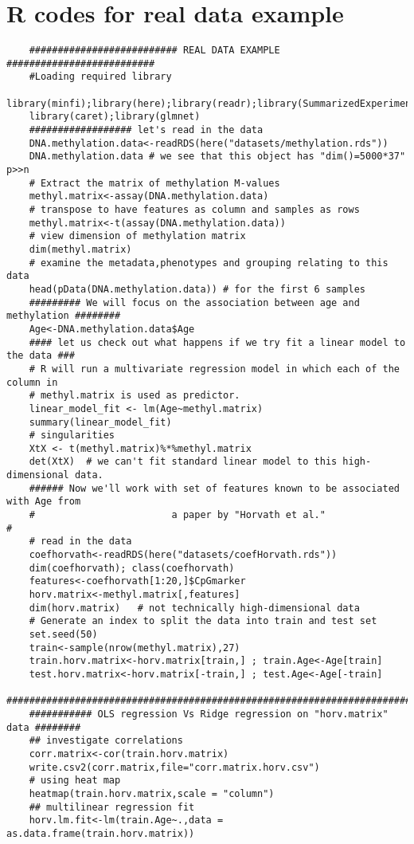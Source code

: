 \documentclass[12pt]{report}
\begin{document}
\section{R codes for real data example}
\label{a2}
\begin{lstlisting}
	########################## REAL DATA EXAMPLE ##########################
	#Loading required library
	library(minfi);library(here);library(readr);library(SummarizedExperiment)
	library(caret);library(glmnet)
	################## let's read in the data
	DNA.methylation.data<-readRDS(here("datasets/methylation.rds"))
	DNA.methylation.data # we see that this object has "dim()=5000*37" p>>n
	# Extract the matrix of methylation M-values
	methyl.matrix<-assay(DNA.methylation.data)
	# transpose to have features as column and samples as rows
	methyl.matrix<-t(assay(DNA.methylation.data))
	# view dimension of methylation matrix
	dim(methyl.matrix)
	# examine the metadata,phenotypes and grouping relating to this data
	head(pData(DNA.methylation.data)) # for the first 6 samples
	######### We will focus on the association between age and methylation ########
	Age<-DNA.methylation.data$Age
	#### let us check out what happens if we try fit a linear model to the data ###
	# R will run a multivariate regression model in which each of the column in 
	# methyl.matrix is used as predictor.
	linear_model_fit <- lm(Age~methyl.matrix)
	summary(linear_model_fit)
	# singularities
	XtX <- t(methyl.matrix)%*%methyl.matrix
	det(XtX)  # we can't fit standard linear model to this high-dimensional data.
	###### Now we'll work with set of features known to be associated with Age from
	#                        a paper by "Horvath et al."                         #
	# read in the data
	coefhorvath<-readRDS(here("datasets/coefHorvath.rds"))
	dim(coefhorvath); class(coefhorvath)
	features<-coefhorvath[1:20,]$CpGmarker
	horv.matrix<-methyl.matrix[,features]
	dim(horv.matrix)   # not technically high-dimensional data 
	# Generate an index to split the data into train and test set
	set.seed(50)
	train<-sample(nrow(methyl.matrix),27)
	train.horv.matrix<-horv.matrix[train,] ; train.Age<-Age[train]
	test.horv.matrix<-horv.matrix[-train,] ; test.Age<-Age[-train]
	#############################################################################
	########### OLS regression Vs Ridge regression on "horv.matrix" data ########
	## investigate correlations
	corr.matrix<-cor(train.horv.matrix)
	write.csv2(corr.matrix,file="corr.matrix.horv.csv")
	# using heat map
	heatmap(train.horv.matrix,scale = "column")
	## multilinear regression fit
	horv.lm.fit<-lm(train.Age~.,data = as.data.frame(train.horv.matrix))

\end{lstlisting}
\end{document}
